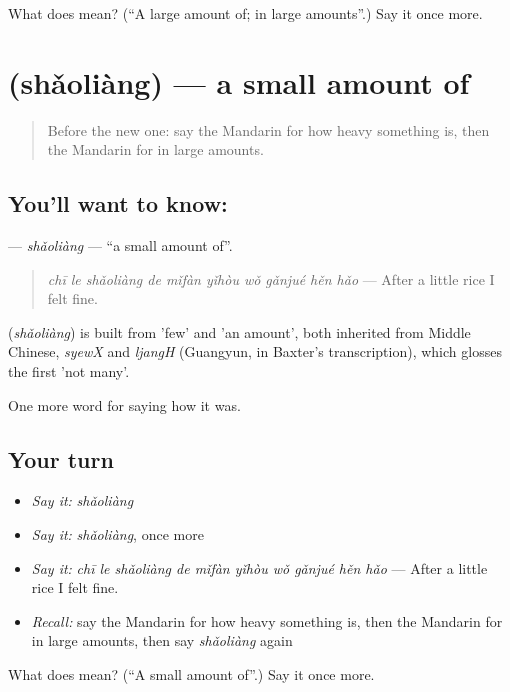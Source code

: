 \begin{tcolorbox}[breakable,colback=teal!4,colframe=teal!35!black,title={Before you move on}]
What does  mean? (\textquotedblleft{}A large amount of; in large amounts\textquotedblright{}.) Say it once more.
\end{tcolorbox}
\section[\texorpdfstring{\zh{少量} (shǎoliàng)}{少量 (shǎoliàng)}]{ (shǎoliàng) — a small amount of}

\label{lesson:ZH-C526-shaoliang}



\begin{quote}
Before the new one: say the Mandarin for how heavy something is, then the Mandarin for in large amounts.
\end{quote}

\subsection*{You'll want to know: }
\textbf{} — \emph{shǎoliàng} — \textquotedblleft{}a small amount of\textquotedblright{}.

\begin{quote}
\textbf{} \emph{chī le shǎoliàng de mǐfàn yǐhòu wǒ gǎnjué hěn hǎo} — After a little rice I felt fine.
\end{quote}

\begin{cousinweb}
\textbf{} (\emph{shǎoliàng}) is built from  'few' and  'an amount', both inherited from Middle Chinese, \emph{syewX} and \emph{ljangH} (Guangyun, in Baxter's transcription), which glosses the first 'not many'.
\end{cousinweb}

\begin{grammarlens}[title={What you've built}]
One more word for saying how it was.
\end{grammarlens}

\subsection*{Your turn}
\begin{itemize}
\raggedright
  \item \emph{Say it:} \emph{shǎoliàng}
  \item \emph{Say it:} \emph{shǎoliàng}, once more
  \item \emph{Say it:} \emph{chī le shǎoliàng de mǐfàn yǐhòu wǒ gǎnjué hěn hǎo} — After a little rice I felt fine.
  \item \emph{Recall:} say the Mandarin for how heavy something is, then the Mandarin for in large amounts, then say \emph{shǎoliàng} again
\end{itemize}

\begin{tcolorbox}[breakable,colback=teal!4,colframe=teal!35!black,title={Before you move on}]
What does  mean? (\textquotedblleft{}A small amount of\textquotedblright{}.) Say it once more.
\end{tcolorbox}
